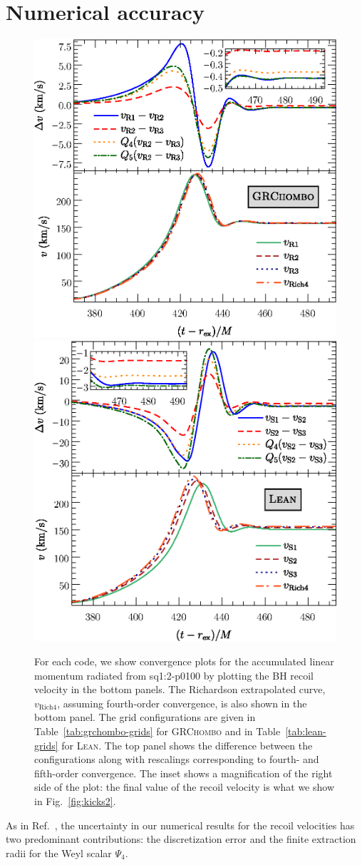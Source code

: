 \documentclass[floats,floatfix,showpacs,amssymb,physrev,twocolumn,superscriptaddress,reprint,
nofootinbib, longbibliography]{revtex4-2}
\begin{document}
\section{Numerical accuracy}
\label{sec:accuracy}
\begin{figure}[t]
    \subfloat%
    {
        \includegraphics[width=0.48\linewidth]{grchombo-convergence5.eps}
    }
    \hfill
    \subfloat%
    {
        \includegraphics[width=0.48\linewidth]{lean-convergence4.eps}
    }
    \caption{For each code, we show convergence plots for the
      accumulated linear momentum radiated from \textsf{sq1:2-p0100}
      by plotting the BH recoil velocity in the bottom panels. The
      Richardson extrapolated curve, $v_{\mathrm{Rich4}}$, assuming
      fourth-order convergence, is also shown in the bottom panel. The
      grid configurations are given in Table~\ref{tab:grchombo-grids}
      for \textsc{GRChombo} and in Table~\ref{tab:lean-grids} for
      \textsc{Lean}. The top panel shows the difference between the
      configurations along with rescalings corresponding to fourth- and
      fifth-order convergence. The inset shows a magnification of the
      right side of the plot: the final value of the recoil
      velocity is what we show in Fig.~\ref{fig:kicks2}.} 
    \label{fig:convergence}
\end{figure}
As in Ref.~\cite{Sperhake:2019wwo}, the uncertainty in our numerical results 
for the recoil velocities has two predominant contributions: the 
discretization error and the finite extraction radii for the Weyl scalar
$\Psi_4$.
\end{document}
